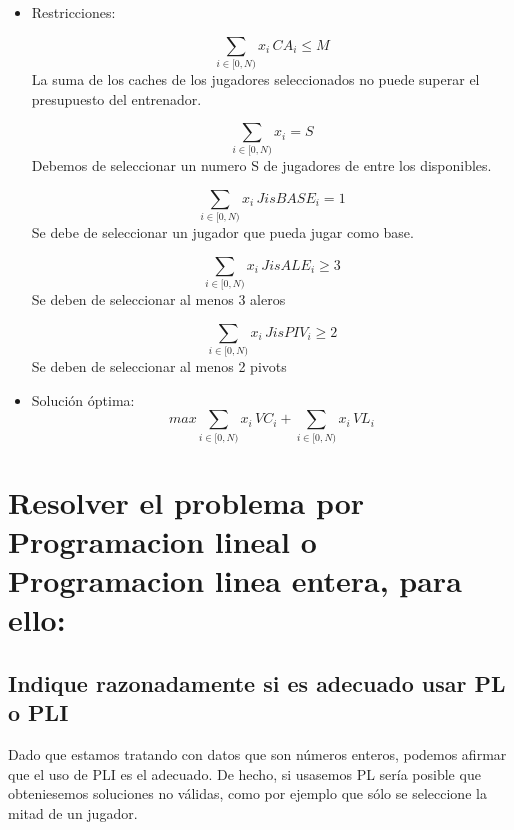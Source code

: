 \documentclass[a4paper,12pt]{article}
\begin{document}
\begin{itemize}
 \item Restricciones:

 \begin{equation}
  \sum_{i \in [0,N)}{x_i \, CA_i} \leq M
 \end{equation}
 La suma de los caches de los jugadores seleccionados no puede superar el presupuesto del entrenador.

  \begin{equation}
  \sum_{i \in [0,N)}{x_i} = S
 \end{equation}
 Debemos de seleccionar un numero S de jugadores de entre los disponibles.

 \begin{equation}
  \sum_{i \in [0,N)}{x_i \, JisBASE_i} = 1
 \end{equation}
 Se debe de seleccionar un jugador que pueda jugar como base.

\begin{equation}
  \sum_{i \in [0,N)}{x_i \, JisALE_i} \geq 3
 \end{equation}
 Se deben de seleccionar al menos 3 aleros

\begin{equation}
  \sum_{i \in [0,N)}{x_i \, JisPIV_i} \geq 2
 \end{equation}
 Se deben de seleccionar al menos 2 pivots\\


 \item Solución óptima:\\

\begin{equation*}
max  \sum_{i \in [0,N)}{x_i \, VC_i}+\sum_{i \in [0,N)}{x_i \, VL_i}
\end{equation*}


\end{itemize}


\section{Resolver el problema por Programacion lineal o Programacion linea entera, para ello:}

\subsection{Indique razonadamente si es adecuado usar PL o PLI}

Dado que estamos tratando con datos que son números enteros, podemos afirmar que el uso de PLI
es el adecuado. De hecho, si usasemos PL sería posible que obteniesemos soluciones no válidas,
como por ejemplo que sólo se seleccione la mitad de un jugador.
\end{document}
